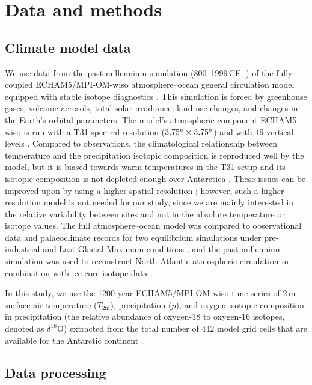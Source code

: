 \documentclass[cp]{copernicus}
\begin{document}
\hack{\clearpage}

\section{Data and methods}\label{methods}

\subsection{Climate model data}\label{methods:data}

We use data from the past-millennium simulation (800--1999\,CE;
\citealp{Sjolte2018}) of the fully coupled ECHAM5/MPI-OM-wiso atmosphere--ocean
general circulation model equipped with stable isotope diagnostics
\citep{Werner2016}. This simulation is forced by greenhouse gases, volcanic
aerosols, total solar irradiance, land use changes, and changes in the Earth's
orbital parameters. The model's atmospheric component ECHAM5-wiso is run with a
T31 spectral resolution ($3.75^{\circ}\times3.75^{\circ}$) and with $19$ vertical
levels \citep{Sjolte2018}. Compared to observations, the climatological
relationship between temperature and the precipitation isotopic composition is
reproduced well by the model, but it is biased towards warm temperatures in the
T31 setup and its isotopic composition is not depleted enough over Antarctica
\citep{Werner2011}. These issues can be improved upon by using a higher spatial
resolution \citep{Werner2011}; however, such a higher-resolution model is not
needed for our study, since we are mainly interested in the relative variability
between sites and not in the absolute temperature or isotope values. The full
atmosphere--ocean model was compared to observational data and palaeoclimate
records for two equilibrium simulations under pre-industrial and Last Glacial
Maximum conditions \citep{Werner2016}, and the past-millennium simulation was
used to reconstruct North Atlantic atmospheric circulation in combination with
ice-core isotope data \citep{Sjolte2018}.

In this study, we use the 1200-year ECHAM5/MPI-OM-wiso time series of 2\,m
surface air temperature ($T_{2\mathrm{m}}$), precipitation ($p$), and oxygen
isotopic composition in precipitation (the relative abundance of oxygen-18 to
oxygen-16 isotopes, denoted as $\delta^{18}\mathrm{O}$) extracted from the total
number of $442$ model grid cells that are available for the Antarctic continent
\citep{Munch2020}.

\subsection{Data processing}\label{methods:prc}
\end{document}
